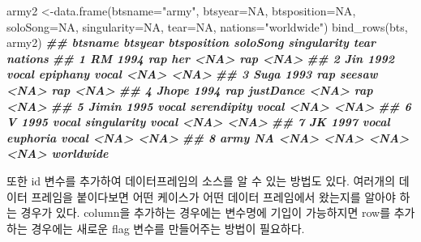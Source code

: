\documentclass[
]{book}
\newenvironment{Shaded}{\begin{snugshade}}{\end{snugshade}}
\newcommand{\AttributeTok}[1]{\textcolor[rgb]{0.77,0.63,0.00}{#1}}
\newcommand{\ConstantTok}[1]{\textcolor[rgb]{0.00,0.00,0.00}{#1}}
\newcommand{\DocumentationTok}[1]{\textcolor[rgb]{0.56,0.35,0.01}{\textbf{\textit{#1}}}}
\newcommand{\FunctionTok}[1]{\textcolor[rgb]{0.00,0.00,0.00}{#1}}
\newcommand{\NormalTok}[1]{#1}
\newcommand{\OtherTok}[1]{\textcolor[rgb]{0.56,0.35,0.01}{#1}}
\newcommand{\StringTok}[1]{\textcolor[rgb]{0.31,0.60,0.02}{#1}}
\theoremstyle{definition}
\theoremstyle{definition}
\theoremstyle{definition}
\theoremstyle{definition}
\theoremstyle{remark}
\begin{document}
\begin{Shaded}
\begin{Highlighting}[]
\NormalTok{army2 }\OtherTok{\textless{}{-}}\FunctionTok{data.frame}\NormalTok{(}\AttributeTok{btsname=}\StringTok{"army"}\NormalTok{, }\AttributeTok{btsyear=}\ConstantTok{NA}\NormalTok{, }\AttributeTok{btsposition=}\ConstantTok{NA}\NormalTok{, }\AttributeTok{soloSong=}\ConstantTok{NA}\NormalTok{, }\AttributeTok{singularity=}\ConstantTok{NA}\NormalTok{, }\AttributeTok{tear=}\ConstantTok{NA}\NormalTok{, }\AttributeTok{nations=}\StringTok{"worldwide"}\NormalTok{)}
\FunctionTok{bind\_rows}\NormalTok{(bts, army2)}
\DocumentationTok{\#\#   btsname btsyear btsposition    soloSong singularity tear   nations}
\DocumentationTok{\#\# 1      RM    1994         rap         her        \textless{}NA\textgreater{}  rap      \textless{}NA\textgreater{}}
\DocumentationTok{\#\# 2     Jin    1992       vocal    epiphany       vocal \textless{}NA\textgreater{}      \textless{}NA\textgreater{}}
\DocumentationTok{\#\# 3    Suga    1993         rap      seesaw        \textless{}NA\textgreater{}  rap      \textless{}NA\textgreater{}}
\DocumentationTok{\#\# 4   Jhope    1994         rap   justDance        \textless{}NA\textgreater{}  rap      \textless{}NA\textgreater{}}
\DocumentationTok{\#\# 5   Jimin    1995       vocal serendipity       vocal \textless{}NA\textgreater{}      \textless{}NA\textgreater{}}
\DocumentationTok{\#\# 6       V    1995       vocal singularity       vocal \textless{}NA\textgreater{}      \textless{}NA\textgreater{}}
\DocumentationTok{\#\# 7      JK    1997       vocal    euphoria       vocal \textless{}NA\textgreater{}      \textless{}NA\textgreater{}}
\DocumentationTok{\#\# 8    army      NA        \textless{}NA\textgreater{}        \textless{}NA\textgreater{}        \textless{}NA\textgreater{} \textless{}NA\textgreater{} worldwide}
\end{Highlighting}
\end{Shaded}

또한 id 변수를 추가하여 데이터프레임의 소스를 알 수 있는 방법도 있다. 여러개의 데이터 프레임을 붙이다보면 어떤 케이스가 어떤 데이터 프레임에서 왔는지를 알아야 하는 경우가 있다. column을 추가하는 경우에는 변수명에 기입이 가능하지면 row를 추가하는 경우에는 새로운 flag 변수를 만들어주는 방법이 필요하다.
\end{document}
